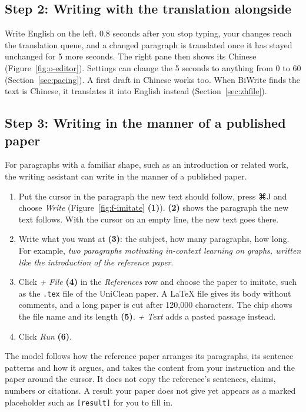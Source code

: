 \documentclass[a4paper,11pt]{article}
\newcommand{\cmdkey}{{\keysfont ⌘}}
\newcommand{\ui}[1]{\emph{#1}}
\newcommand{\n}[1]{\textbf{(#1)}}
\newcommand{\fig}[1]{Figure~\ref{fig:#1}}
\begin{document}
\subsection{Step 2: Writing with the translation alongside}
Write English on the left. 0.8 seconds after you stop typing, your changes reach the translation queue, and a changed paragraph is translated once it has stayed unchanged for 5 more seconds. The right pane then shows its Chinese (\fig{o-editor}). Settings can change the 5 seconds to anything from 0 to 60 (Section~\ref{sec:pacing}). A first draft in Chinese works too. When BiWrite finds the text is Chinese, it translates it into English instead (Section~\ref{sec:zhfile}).

\subsection{Step 3: Writing in the manner of a published paper}
For paragraphs with a familiar shape, such as an introduction or related work, the writing assistant can write in the manner of a published paper.
\begin{enumerate}
\item Put the cursor in the paragraph the new text should follow, press \cmdkey J and choose \ui{Write} (\fig{f-imitate} \n{1}). \n{2} shows the paragraph the new text follows. With the cursor on an empty line, the new text goes there.
\item Write what you want at \n{3}: the subject, how many paragraphs, how long. For example, \ui{two paragraphs motivating in-context learning on graphs, written like the introduction of the reference paper}.
\item Click \ui{+ File} \n{4} in the \ui{References} row and choose the paper to imitate, such as the \texttt{.tex} file of the UniClean paper. A LaTeX file gives its body without comments, and a long paper is cut after 120,000 characters. The chip shows the file name and its length \n{5}. \ui{+ Text} adds a pasted passage instead.
\item Click \ui{Run} \n{6}.
\end{enumerate}
The model follows how the reference paper arranges its paragraphs, its sentence patterns and how it argues, and takes the content from your instruction and the paper around the cursor. It does not copy the reference's sentences, claims, numbers or citations. A result your paper does not give yet appears as a marked placeholder such as \texttt{[result]} for you to fill in.
\end{document}
